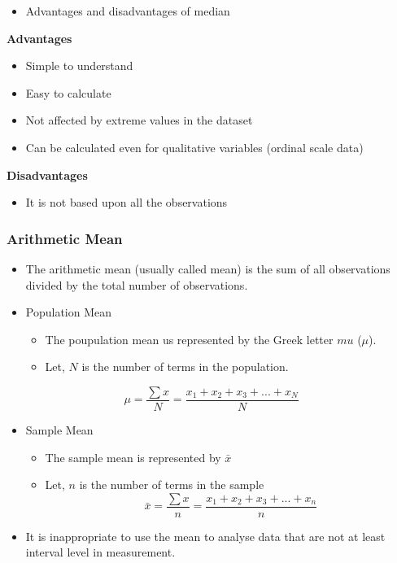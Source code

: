 \documentclass[]{book}
\providecommand{\tightlist}{%
  \setlength{\itemsep}{0pt}\setlength{\parskip}{0pt}}
\begin{document}
\begin{itemize}
\tightlist
\item
  Advantages and disadvantages of median
\end{itemize}

\textbf{Advantages}

\begin{itemize}
\tightlist
\item
  Simple to understand
\item
  Easy to calculate
\item
  Not affected by extreme values in the dataset
\item
  Can be calculated even for qualitative variables (ordinal scale data)
\end{itemize}

\textbf{Disadvantages}

\begin{itemize}
\tightlist
\item
  It is not based upon all the observations
\end{itemize}

\hypertarget{arithmetic-mean}{%
\subsubsection{Arithmetic Mean}\label{arithmetic-mean}}

\begin{itemize}
\item
  The arithmetic mean (usually called mean) is the sum of all observations divided by the total number of observations.
\item
  Population Mean

  \begin{itemize}
  \item
    The poupulation mean us represented by the Greek letter \(mu\) (\(\mu\)).
  \item
    Let, \(N\) is the number of terms in the population.
  \end{itemize}
\end{itemize}

\[\mu = \frac{\sum{x}}{N}=\frac{x_1+x_2+x_3+...+x_N}{N}\]

\begin{itemize}
\item
  Sample Mean

  \begin{itemize}
  \tightlist
  \item
    The sample mean is represented by \(\bar{x}\)
  \item
    Let, \(n\) is the number of terms in the sample
    \[\bar{x} = \frac{\sum{x}}{n}=\frac{x_1+x_2+x_3+...+x_n}{n}\]
  \end{itemize}
\item
  It is inappropriate to use the mean to analyse data that are not at least interval level in measurement.
\end{itemize}
\end{document}
